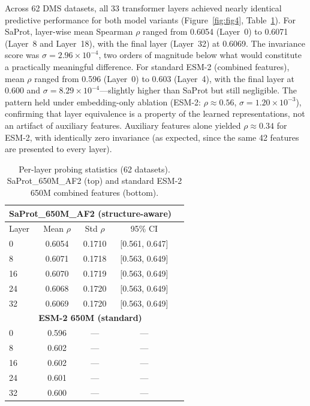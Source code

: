 \documentclass[11pt,a4paper]{article}
\begin{document}
Across 62 DMS datasets, all 33 transformer layers achieved nearly identical predictive
performance for both model variants (Figure~\ref{fig:fig4}, Table~\ref{tab:probing}).
For SaProt, layer-wise mean Spearman $\rho$ ranged from 0.6054 (Layer~0) to 0.6071
(Layer~8 and Layer~18), with the final layer (Layer~32) at 0.6069. The invariance score
was $\sigma = 2.96 \times 10^{-4}$, two orders of magnitude below what would
constitute a practically meaningful difference. For standard ESM-2 (combined features),
mean $\rho$ ranged from 0.596 (Layer~0) to 0.603 (Layer~4), with the final layer at
0.600 and $\sigma = 8.29 \times 10^{-4}$---slightly higher than SaProt but still
negligible. The pattern held under embedding-only ablation
(ESM-2: $\rho \approx 0.56$, $\sigma = 1.20 \times 10^{-3}$), confirming that layer
equivalence is a property of the learned representations, not an artifact of auxiliary
features. Auxiliary features alone yielded $\rho \approx 0.34$ for ESM-2, with
identically zero invariance (as expected, since the same 42 features are presented
to every layer).

\begin{table}[ht]
\centering
\caption{Per-layer probing statistics (62 datasets). SaProt\_650M\_AF2 (top) and
standard ESM-2 650M combined features (bottom).}
\label{tab:probing}
\begin{tabular}{lcccc}
\toprule
\multicolumn{4}{c}{\textbf{SaProt\_650M\_AF2 (structure-aware)}} \\
\midrule
Layer & Mean $\rho$ & Std $\rho$ & 95\% CI \\
\midrule
0  & 0.6054 & 0.1710 & [0.561, 0.647] \\
8  & 0.6071 & 0.1718 & [0.563, 0.649] \\
16 & 0.6070 & 0.1719 & [0.563, 0.649] \\
24 & 0.6068 & 0.1720 & [0.563, 0.649] \\
32 & 0.6069 & 0.1720 & [0.563, 0.649] \\
\midrule
\multicolumn{4}{c}{\textbf{ESM-2 650M (standard)}} \\
\midrule
0  & 0.596 & --- & --- \\
8  & 0.602 & --- & --- \\
16 & 0.602 & --- & --- \\
24 & 0.601 & --- & --- \\
32 & 0.600 & --- & --- \\
\bottomrule
\end{tabular}
\end{table}
\end{document}
